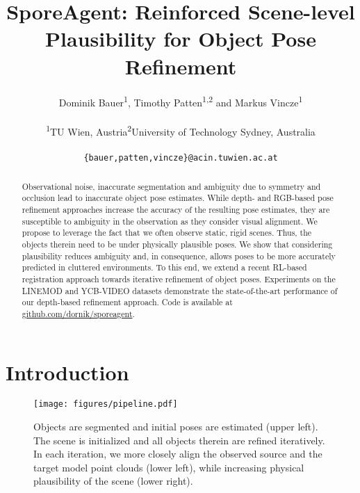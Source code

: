 \documentclass[10pt,twocolumn,letterpaper]{article}
\newcommand\Mark[1]{\textsuperscript{#1}}
\begin{document}
\title{SporeAgent: Reinforced Scene-level Plausibility for Object Pose Refinement}
\author{
Dominik Bauer\Mark{1}, Timothy Patten\Mark{1,2} and Markus Vincze\Mark{1}\\
\begin{tabular}{cc}
\Mark{1}TU Wien, Austria & \Mark{2}University of Technology Sydney, Australia
\end{tabular}\\
{\tt\small \{bauer,patten,vincze\}@acin.tuwien.ac.at}
}
\maketitle

\thispagestyle{empty}

\begin{abstract}
Observational noise, inaccurate segmentation and ambiguity due to symmetry and occlusion lead to inaccurate object pose estimates. While depth- and RGB-based pose refinement approaches increase the accuracy of the resulting pose estimates, they are susceptible to ambiguity in the observation as they consider visual alignment.
%
We propose to leverage the fact that we often observe static, rigid scenes. Thus, the objects therein need to be under physically plausible poses. We show that considering plausibility reduces ambiguity and, in consequence, allows poses to be more accurately predicted in cluttered environments. To this end, we extend a recent RL-based registration approach towards iterative refinement of object poses.
%
Experiments on the LINEMOD and YCB-VIDEO datasets demonstrate the state-of-the-art performance of our depth-based refinement approach. 
%
Code is available at \href{https://www.github.com/dornik/sporeagent}{github.com/dornik/sporeagent}.
\end{abstract}

\section{Introduction}

\begin{figure}
    \centering
    \texttt{[image: figures/pipeline.pdf]}
    \caption{Objects are segmented and initial poses are estimated (upper left). The scene is initialized and all objects therein are refined iteratively. In each iteration, we more closely align the observed source and the target model point clouds  (lower left), while increasing physical plausibility of the scene (lower right).
    }
    \label{fig:teaser}
\end{figure}
\end{document}
